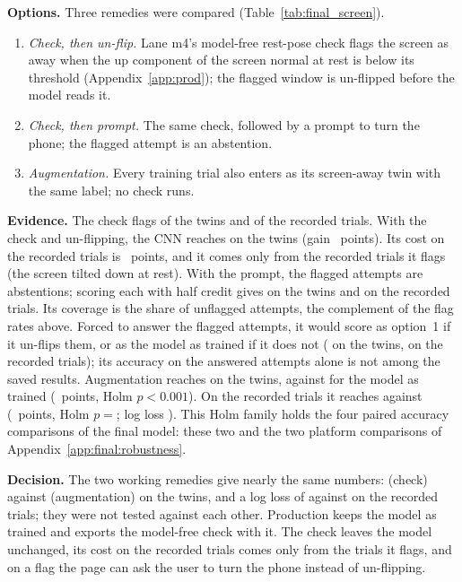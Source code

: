 \textbf{Options.}
Three remedies were compared (Table~\ref{tab:final_screen}).
\begin{enumerate}[nosep]
  \item \emph{Check, then un-flip.} Lane m4's model-free rest-pose check flags the screen as away when the up component of the screen normal at rest is below its threshold (Appendix~\ref{app:prod}); the flagged window is un-flipped before the model reads it.
  \item \emph{Check, then prompt.} The same check, followed by a prompt to turn the phone; the flagged attempt is an abstention.
  \item \emph{Augmentation.} Every training trial also enters as its screen-away twin with the same label; no check runs.
\end{enumerate}

\textbf{Evidence.}
The check flags  of the twins and  of the recorded trials.
With the check and un-flipping, the CNN reaches  on the twins (gain ~points).
Its cost on the recorded trials is ~points, and it comes only from the recorded trials it flags (the screen tilted down at rest).
With the prompt, the flagged attempts are abstentions; scoring each with half credit gives  on the twins and  on the recorded trials.
Its coverage is the share of unflagged attempts, the complement of the flag rates above.
Forced to answer the flagged attempts, it would score as option~1 if it un-flips them, or as the model as trained if it does not ( on the twins,  on the recorded trials); its accuracy on the answered attempts alone is not among the saved results.
Augmentation reaches  on the twins, against  for the model as trained (~points, Holm $p < 0.001$).
On the recorded trials it reaches  against  (~points, Holm $p = {}$; log loss ).
This Holm family holds the four paired accuracy comparisons of the final model: these two and the two platform comparisons of Appendix~\ref{app:final:robustness}.

\textbf{Decision.}
The two working remedies give nearly the same numbers:  (check) against  (augmentation) on the twins, and a log loss of  against  on the recorded trials; they were not tested against each other.
Production keeps the model as trained and exports the model-free check with it.
The check leaves the model unchanged, its cost on the recorded trials comes only from the trials it flags, and on a flag the page can ask the user to turn the phone instead of un-flipping.

